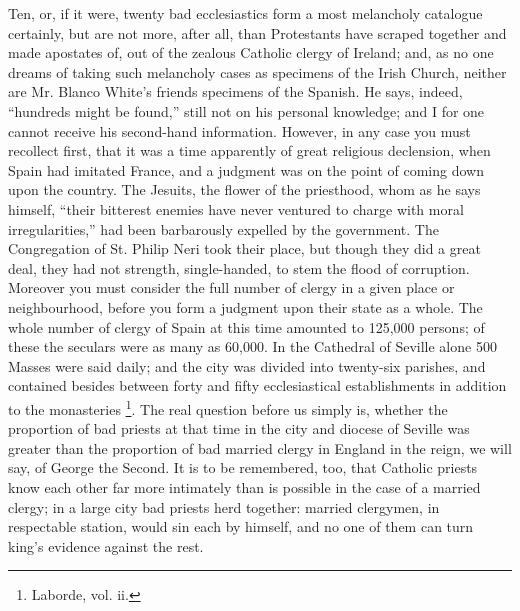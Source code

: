 Ten, or, if it were, twenty bad ecclesiastics form a
most melancholy catalogue certainly, but are not more,
after all, than Protestants have scraped together and
made apostates of, out of the zealous Catholic clergy of
Ireland; and, as no one dreams of taking such melancholy
cases as specimens of the Irish Church, neither are Mr.
Blanco White's friends specimens of the Spanish. He says,
indeed, ``hundreds might be found,'' still not on
his personal knowledge; and I for one cannot receive his
second-hand information. However, in any case you must
recollect first, that it was a time apparently of great
religious declension, when Spain had imitated France, and
a judgment was on the point of coming down upon the
country. The Jesuits, the flower of the priesthood, whom
as he says himself, ``their bitterest enemies have
never ventured to charge with moral irregularities,''
had been barbarously expelled by the government. The
Congregation of St. Philip Neri took their place, but
though they did a great deal, they had not strength,
single-handed, to stem the flood of corruption. Moreover
you must consider the full number of clergy in a given
place or neighbourhood, before you form a judgment upon
their state as a whole. The whole number of clergy of
Spain at this time amounted to 125,000 persons; of these
the seculars were as many as 60,000. In the Cathedral of
Seville alone 500 Masses were said daily; and the city
was divided into twenty-six parishes, and contained
besides between forty and fifty ecclesiastical
establishments in addition to the monasteries \footnote{Laborde,
vol. ii.}. The real question before us simply is, whether
the proportion of bad priests at that time in the city
and diocese of Seville was greater than the proportion of
bad married clergy in England in the reign, we will say,
of George the Second. It is to be remembered, too, that
Catholic priests know each other far more intimately than
is possible in the case of a married clergy; in a large
city bad priests herd together: married clergymen, in
respectable station, would sin each by himself, and no
one of them can turn king's evidence against the rest.

